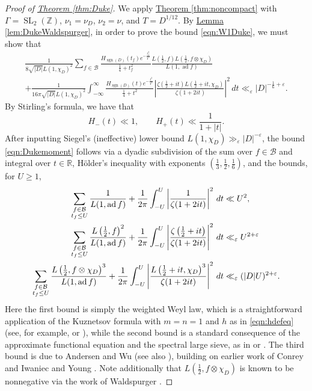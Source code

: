 \documentclass[11pt,a4paper]{amsart}
\newcommand{\BB}{\mathcal{B}}
\newcommand{\e}{\varepsilon}
\newcommand{\R}{\mathbb{R}}
\newcommand{\Z}{\mathbb{Z}}
\DeclareMathOperator{\ad}{ad}
\DeclareMathOperator{\sgn}{sgn}
\DeclareMathOperator{\SL}{SL}
\numberwithin{equation}{section}
\theoremstyle{remark}
\theoremstyle{definition}
\begin{document}
\begin{proof}[Proof of {\hyperref[thm:Duke]{Theorem \ref*{thm:Duke}}}]
We apply \hyperref[thm:noncompact]{Theorem \ref*{thm:noncompact}} with $\Gamma = \SL_2(\Z)$, $\nu_1 = \nu_D$, $\nu_2 = \nu$, and $T = D^{1/12}$. By \hyperref[lem:DukeWaldspurger]{Lemma \ref*{lem:DukeWaldspurger}}, in order to prove the bound \eqref{eqn:W1Duke}, we must show that
\begin{multline}
\label{eqn:Dukemoment}
\frac{1}{8\sqrt{|D|} L(1,\chi_D)^2} \sum_{f \in \BB} \frac{H_{\sgn(D)}(t_f) e^{-\frac{t_f^2}{T^2}}}{\frac{1}{4} + t_f^2} \frac{L\left(\frac{1}{2},f\right) L\left(\frac{1}{2}, f \otimes \chi_D\right)}{L(1,\ad f)}	\\
+ \frac{1}{16\pi \sqrt{|D|} L(1,\chi_D)^2} \int_{-\infty}^{\infty} \frac{H_{\sgn(D)}(t) e^{-\frac{t^2}{T^2}}}{\frac{1}{4} + t^2} \left|\frac{\zeta\left(\frac{1}{2} + it\right) L\left(\frac{1}{2} + it, \chi_D\right)}{\zeta(1 + 2it)}\right|^2 \, dt \ll_{\e} |D|^{-\frac{1}{6} + \e}.
\end{multline}
By Stirling's formula, we have that
\[H_{-}(t) \ll 1, \qquad H_{+}(t) \ll \frac{1}{1 + |t|}.\]
After inputting Siegel's (ineffective) lower bound $L(1,\chi_D) \gg_{\e} |D|^{-\e}$, the bound \eqref{eqn:Dukemoment} follows via a dyadic subdivision of the sum over $f \in \BB$ and integral over $t \in \R$, H\"{o}lder's inequality with exponents $(\frac{1}{3},\frac{1}{2},\frac{1}{6})$, and the bounds, for $U \geq 1$,
\begin{align}
\label{eqn:weightedWeyl}
\sum_{\substack{f \in \BB \\ t_f \leq U}} \frac{1}{L(1,\ad f)} + \frac{1}{2\pi} \int_{-U}^{U} \left|\frac{1}{\zeta(1 + 2it)}\right|^2 \, dt & \ll U^2,	\\
\notag
\sum_{\substack{f \in \BB \\ t_f \leq U}} \frac{L\left(\frac{1}{2},f\right)^2}{L(1,\ad f)} + \frac{1}{2\pi} \int_{-U}^{U} \left|\frac{\zeta\left(\frac{1}{2} + it\right)}{\zeta(1 + 2it)}\right|^2 \, dt & \ll_{\e} U^{2 + \e}	\\
\notag
\sum_{\substack{f \in \BB \\ t_f \leq U}} \frac{L\left(\frac{1}{2},f \otimes \chi_D\right)^3}{L(1,\ad f)} + \frac{1}{2\pi} \int_{-U}^{U} \left|\frac{L\left(\frac{1}{2} + it,\chi_D\right)^3}{\zeta(1 + 2it)}\right|^2 \, dt & \ll_{\e} (|D| U)^{2 + \e}.
\end{align}
Here the first bound is simply the weighted Weyl law, which is a straightforward application of the Kuznetsov formula \cite[Theorem 9.3]{Iwa02} with $m = n = 1$ and $h$ as in \eqref{eqn:hdefeq} (see, for example, \cite[Lemma 2.4]{Mot97} or \cite[(16.56)]{IK04}), while the second bound is a standard consequence of the approximate functional equation \cite[Theorem 5.3]{IK04} and the spectral large sieve, as in \cite[Theorem 3.3]{Mot97} or \cite[Theorem 7.24]{IK04}. The third bound is due to Andersen and Wu \cite[Theorem 4.1]{AW23} (see also \cite[Theorem 11.1]{GHLN26}), building on earlier work of Conrey and Iwaniec \cite{CI00} and Young \cite{You17}. Note additionally that $L(\frac{1}{2},f \otimes \chi_D)$ is known to be nonnegative via the work of Waldspurger \cite[Th\'{e}or\`{e}me 1]{Wal81}.


\end{proof}
\end{document}
